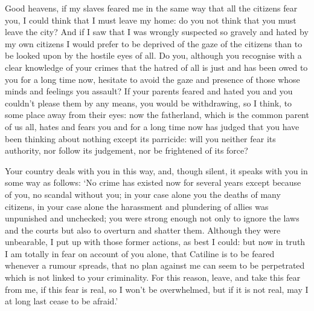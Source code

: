 {  Good heavens, if my slaves feared me in the same way that all the citizens fear you, I could think that I must leave my home: do you not think that you must leave the city? And if I saw that I was wrongly suspected so gravely and hated by my own citizens I would prefer to be deprived of the gaze of the citizens than to be looked upon by the hostile eyes of all. Do you, although you recognise with a clear knowledge of your crimes that the hatred of all is just and has been owed to you for a long time now, hesitate to avoid the gaze and presence of those whose minds and feelings you assault? If your parents feared and hated you and you couldn’t please them by any means, you would be withdrawing, so I think, to some place away from their eyes: now the fatherland, which is the common parent of us all, hates and fears you and for a long time now has judged that you have been thinking about nothing except its parricide: will you neither fear its authority, nor follow its judgement, nor be frightened of its force?

  Your country deals with you in this way, and, though silent, it speaks with you in some way as follows: `No crime has existed now for several years except because of you, no scandal without you; in your case alone you the deaths of many citizens, in your case alone the harassment and plundering of allies was unpunished and unchecked; you were strong enough not only to ignore the laws and the courts but also to overturn and shatter them. Although they were unbearable, I put up with those former actions, as best I could: but now in truth I am totally in fear on account of you alone, that Catiline is to be feared whenever a rumour spreads, that no plan against me can seem to be perpetrated which is not linked to your criminality. For this reason, leave, and take this fear from me, if this fear is real, so I won’t be overwhelmed, but if it is not real, may I at long last cease to be afraid.'
}
